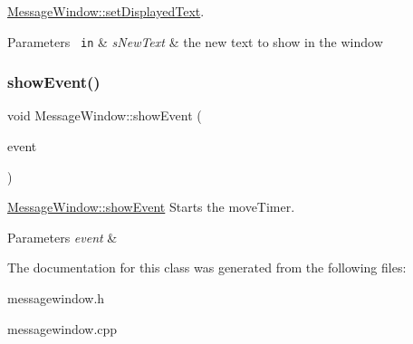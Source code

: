 \mbox{\hyperlink{classMessageWindow_ad3b6dcb371660e6a3e0ded36564afafa}{Message\+Window\+::set\+Displayed\+Text}}. 


\begin{DoxyParams}[1]{Parameters}
\mbox{\texttt{ in}}  & {\em s\+New\+Text} & the new text to show in the window \\
\hline
\end{DoxyParams}
\mbox{\label{classMessageWindow_aee9d8dca7a7576d47eab37c8cb30a26d}} 
\subsubsection{\texorpdfstring{show\+Event()}{showEvent()}}
{\footnotesize\ttfamily void Message\+Window\+::show\+Event (\begin{DoxyParamCaption}\item[{Q\+Show\+Event $\ast$}]{event }\end{DoxyParamCaption})}



\mbox{\hyperlink{classMessageWindow_aee9d8dca7a7576d47eab37c8cb30a26d}{Message\+Window\+::show\+Event}} Starts the move\+Timer. 


\begin{DoxyParams}{Parameters}
{\em event} & \\
\hline
\end{DoxyParams}


The documentation for this class was generated from the following files\+:\begin{DoxyCompactItemize}
\item 
messagewindow.\+h\item 
messagewindow.\+cpp\end{DoxyCompactItemize}
